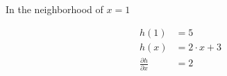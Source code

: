
In the neighborhood of $x = 1$

\begin{align*}
    h(1) &= 5 \\
    h(x) &= 2 \cdot x + 3 \\
    \frac{\partial h}{\partial x} &= 2
\end{align*}

